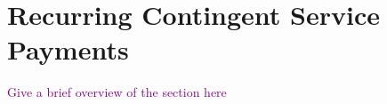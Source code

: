 
\section{Recurring Contingent Service Payments}
\textcolor{purple}{Give a brief overview of the section here}
%
%


